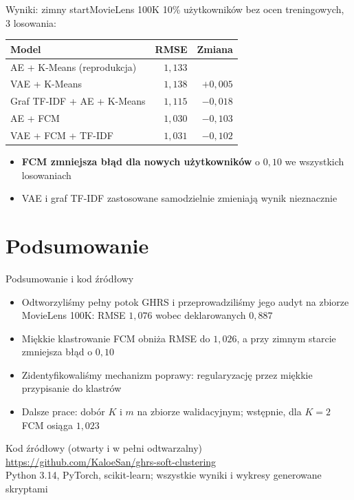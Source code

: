 \documentclass[red]{beamer}
\begin{document}
    \begin{frame}{Wyniki: zimny start}{MovieLens 100K}
        \small
        10\% użytkowników bez ocen treningowych, 3 losowania:
        \begin{center}
            \begin{tabular}{lrr}
                \toprule
                \textbf{Model} & \textbf{RMSE} & \textbf{Zmiana} \\
                \midrule
                AE + K-Means (reprodukcja) & $1{,}133$ & \\
                VAE + K-Means & $1{,}138$ & $+0{,}005$ \\
                Graf TF-IDF + AE + K-Means & $1{,}115$ & $-0{,}018$ \\
                AE + FCM & $1{,}030$ & $-0{,}103$ \\
                VAE + FCM + TF-IDF & $1{,}031$ & $-0{,}102$ \\
                \bottomrule
            \end{tabular}
        \end{center}
        \begin{itemize}
            \item \textbf{FCM zmniejsza błąd dla nowych użytkowników} o $0{,}10$
                  we wszystkich losowaniach
            \item VAE i graf TF-IDF zastosowane samodzielnie zmieniają wynik nieznacznie
        \end{itemize}
    \end{frame}

    \section{Podsumowanie}
    \begin{frame}{Podsumowanie i kod źródłowy}
        \small
        \begin{itemize}
            \item Odtworzyliśmy pełny potok GHRS i przeprowadziliśmy jego audyt na zbiorze
                  MovieLens 100K: RMSE $1{,}076$ wobec deklarowanych $0{,}887$
            \item Miękkie klastrowanie FCM obniża RMSE do $1{,}026$, a przy zimnym
                  starcie zmniejsza błąd o $0{,}10$
            \item Zidentyfikowaliśmy mechanizm poprawy: regularyzację przez miękkie
                  przypisanie do klastrów
            \item Dalsze prace: dobór $K$ i $m$ na zbiorze walidacyjnym; wstępnie,
                  dla $K = 2$ FCM osiąga $1{,}023$
        \end{itemize}
        \begin{block}{Kod źródłowy (otwarty i w pełni odtwarzalny)}
            \url{https://github.com/KaloeSan/ghrs-soft-clustering}\\[2pt]
            Python 3.14, PyTorch, scikit-learn; wszystkie wyniki i wykresy generowane
            skryptami
        \end{block}
    \end{frame}
\end{document}
